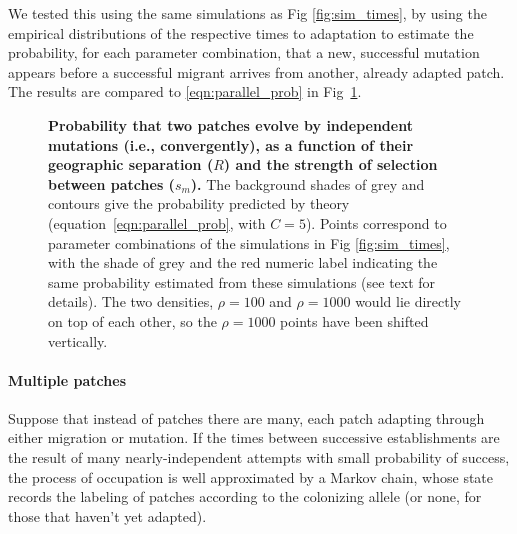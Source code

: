 \documentclass[10pt,letterpaper]{article}
\begin{document}
We tested this using the same simulations as Fig \ref{fig:sim_times},
by using the empirical distributions of the respective times to adaptation
to estimate the probability,
for each parameter combination,
that a new, successful mutation appears 
before a successful migrant arrives from another, already adapted patch.
The results are compared to \eqref{eqn:parallel_prob}
in Fig~\ref{fig:sim_probs}.


\begin{figure}[ht!]
  \begin{center}
  \end{center}
  \caption{
      \textbf{Probability that two patches 
      evolve by independent mutations (i.e., convergently),
      as a function of their geographic separation ($R$)
      and the strength of selection between patches ($s_m$).}
      The background shades of grey and contours
      give the probability predicted by theory (equation~\eqref{eqn:parallel_prob}, with $C=5$).
      Points correspond to parameter combinations of the simulations in Fig \ref{fig:sim_times},
      with the shade of grey and the red numeric label indicating the same probability
      estimated from these simulations (see text for details).
      The two densities, $\rho=100$ and $\rho=1000$ would lie directly on top of each other, so the $\rho=1000$ points have been shifted vertically.
  }   \label{fig:sim_probs}
\end{figure}


\paragraph{Multiple patches}

Suppose that instead of patches there are many,
each patch adapting through either migration or mutation.
If the times between successive establishments are the result of many nearly-independent attempts
with small probability of success,
the process of occupation is well approximated by a Markov chain,
whose state records the labeling of patches according to the colonizing allele
(or none, for those that haven't yet adapted).
\end{document}
